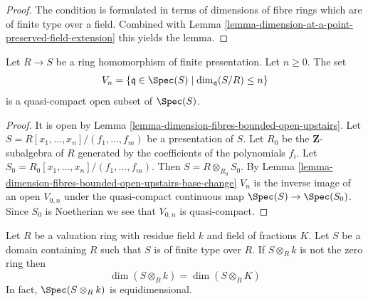 \begin{proof}
The condition is formulated in terms of dimensions
of fibre rings which are of finite type over a field.
Combined with
Lemma \ref{lemma-dimension-at-a-point-preserved-field-extension}
this yields the lemma.
\end{proof}

\begin{lemma}
\label{lemma-dimension-fibres-bounded-quasi-compact-open-upstairs}
Let $R \to S$ be a ring homomorphism of finite presentation.
Let $n \geq 0$. The set
$$
V_n = \{\mathfrak q \in \Spec(S) \mid \dim_{\mathfrak q}(S/R) \leq n\}
$$
is a quasi-compact open subset of $\Spec(S)$.
\end{lemma}

\begin{proof}
It is open by Lemma \ref{lemma-dimension-fibres-bounded-open-upstairs}.
Let $S = R[x_1, \ldots, x_n]/(f_1, \ldots, f_m)$ be a presentation of
$S$. Let $R_0$ be the $\mathbf{Z}$-subalgebra of $R$ generated by the
coefficients of the polynomials $f_i$.
Let $S_0 = R_0[x_1, \ldots, x_n]/(f_1, \ldots, f_m)$.
Then $S = R \otimes_{R_0} S_0$. By
Lemma \ref{lemma-dimension-fibres-bounded-open-upstairs-base-change}
$V_n$ is the inverse image of an open $V_{0, n}$ under the quasi-compact
continuous map $\Spec(S) \to \Spec(S_0)$. Since
$S_0$ is Noetherian we see that $V_{0, n}$ is quasi-compact.
\end{proof}

\begin{lemma}
\label{lemma-finite-type-domain-over-valuation-ring-dim-fibres}
Let $R$ be a valuation ring with residue field $k$ and field
of fractions $K$. Let $S$ be a domain containing $R$ such that
$S$ is of finite type over $R$. If $S \otimes_R k$ is not the
zero ring then
$$
\dim(S \otimes_R k) = \dim(S \otimes_R K)
$$
In fact, $\Spec(S \otimes_R k)$ is equidimensional.
\end{lemma}

